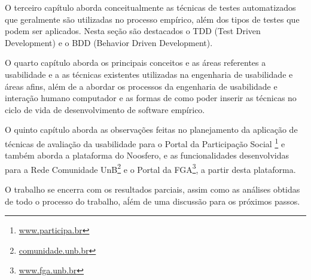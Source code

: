O terceiro capítulo aborda conceitualmente as técnicas de testes automatizados que geralmente são utilizadas no processo empírico, além dos tipos de testes que podem ser aplicados. Nesta seção são destacados o TDD (Test Driven Development) e o BDD (Behavior Driven Development).

O quarto capítulo aborda os principais conceitos e as áreas referentes a usabilidade e a as técnicas existentes utilizadas na engenharia de usabilidade e áreas afins, além de a abordar os processos da engenharia de usabilidade e interação humano computador e as formas de como poder inserir as técnicas no ciclo de vida de desenvolvimento de software empírico.

O quinto capítulo aborda as observações feitas no planejamento da aplicação de técnicas de avaliação da usabilidade para o Portal da Participação Social \footnote{\url{www.participa.br}} e também aborda a plataforma do Noosfero, e as funcionalidades desenvolvidas para a Rede Comunidade UnB\footnote{\url{comunidade.unb.br}} e o Portal da FGA\footnote{\url{www.fga.unb.br}}, a partir desta plataforma.

O trabalho se encerra com os resultados parciais, assim como as análises obtidas de todo o processo do trabalho, aĺém de uma discussão para os próximos passos.

	


